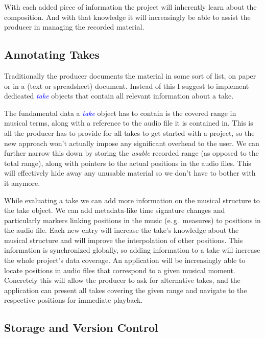\documentclass[11pt,a4paper]{article}
\newcommand*{\term}[1]{\textcolor{blue}{\emph{#1}}}
\begin{document}
With each added piece of information the project will inherently learn about the
composition.
And with that knowledge it will increasingly be able to assist the producer in
managing the recorded material.

\subsection{Annotating Takes}
Traditionally the producer documents the material in some sort of list, on paper
or in a (text or spreadsheet) document.
Instead of this I suggest to implement dedicated \term{take} objects that
contain all relevant information about a take.

The fundamental data a \term{take} object has to contain is the covered range in
musical terms, along with a reference to the audio file it is contained in.
This is all the producer has to provide for all takes to get started with a
project, so the new approach won't actually impose any significant overhead to
the user.
We can further narrow this down by storing the \emph{usable} recorded range (as
opposed to the total range), along with pointers to the actual positions in the
audio files.
This will effectively hide away any unusable material so we don't have to bother
with it anymore.

While evaluating a take we can add more information on the musical structure to
the take object.
We can add metadata-like time signature changes and particularly markers linking
positions in the music (e.\,g.\ measures) to positions in the audio file.
Each new entry will increase the take's knowledge about the musical structure
and will improve the interpolation of other positions.
This information is synchronized globally, so adding information to a take will
increase the whole project's data coverage.
An application will be increasingly able to locate positions in audio files that
correspond to a given musical moment.
Concretely this will allow the producer to ask for alternative takes, and the
application can present all takes covering the given range and navigate to the
respective positions for immediate playback.

\subsection{Storage and Version Control}
\end{document}
